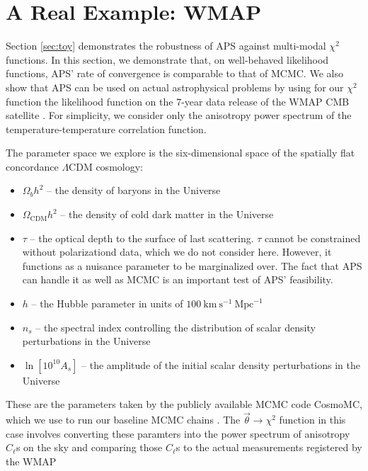\documentclass[useAMS,usenatbib]{aastex}
\begin{document}
\section{A Real Example: WMAP}
\label{sec:wmap}

Section \ref{sec:toy} demonstrates the robustness of APS against multi-modal
$\chi^2$ functions.  In this section, we demonstrate 
that, on well-behaved likelihood functions, APS' rate of convergence is
comparable to that of MCMC.  
We also show that APS can be used on actual astrophysical
problems by using for our $\chi^2$ function the likelihood function on the
7-year data release of the WMAP CMB satellite \cite{wmap7,wmap7likelihood}.
For simplicity, we consider only the anisotropy
power spectrum of the temperature-temperature correlation function.

The parameter space we explore is the six-dimensional space of the spatially
flat concordance $\Lambda$CDM cosmology:
\begin{itemize}
\item$\Omega_bh^2$ -- the density of baryons in the Universe
\\
\item$\Omega_\text{CDM}h^2$ -- the density of cold dark matter in the Universe
\\
\item$\tau$ -- the optical depth to the surface of last scattering.  $\tau$ cannot be
constrained without polarizationd data, which we do not consider here.  However, it functions
as a nuisance parameter to be marginalized over.  The fact that APS can handle it as well as
MCMC is an important test of APS' feasibility.
\\
\item$h$ -- the Hubble parameter in units of
$100~\text{km}~\text{s}^{-1}~\text{Mpc}^{-1}$
\\
\item$n_s$ -- the spectral index controlling the distribution of scalar density
perturbations in the Universe
\\
\item$\ln[10^{10}A_s]$ -- the amplitude of the initial scalar density
perturbations in the Universe
\end{itemize}
These are the parameters taken by the publicly available MCMC code CosmoMC,
which we use to run our baseline MCMC chains \cite{cosmomc}.  The
$\vec{\theta}\rightarrow\chi^2$ function in this case involves converting these
paramters into the power spectrum of anisotropy $C_\ell$s on the sky and
comparing those $C_\ell$s to the actual measurements registered by the WMAP
\end{document}
